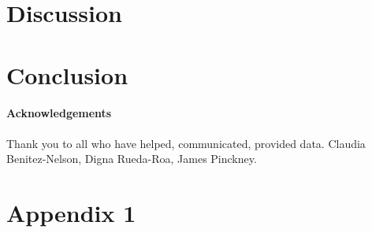 \documentclass[a4paper]{article}
\begin{document}
    \section{Discussion}
    \label{sec:discussion}
    
    
        \section{Conclusion}
    \label{sec:conclusion}
    
    
    
    \paragraph{Acknowledgements} Thank you to all who have helped, communicated, provided data. Claudia Benitez-Nelson, Digna Rueda-Roa, James Pinckney.
    
    
    
    \appendix
    
    \section{Appendix 1}
    \label{app:1}
	
	
\end{document}
